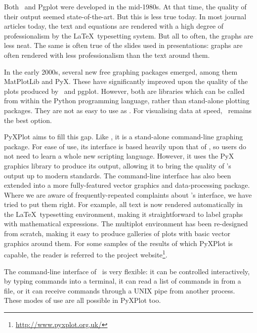 Both \gnuplot\ and Pgplot were developed in the mid-1980s. At that time, the
quality of their output seemed state-of-the-art. But this is less true today.
In most journal articles today, the text and equations are rendered with a high
degree of professionalism by the \LaTeX\ typesetting system. But all to often,
the graphs are less neat.  The same is often true of the slides used in
presentations: graphs are often rendered with less professionalism than the
text around them.

In the early 2000s, several new free graphing packages emerged, among them {\sc
MatPlotLib} and {\sc PyX}.  These have
significantly improved upon the quality of the plots produced by \gnuplot\ and
pgplot. However, both are libraries which can be called from within the Python
programming language, rather than stand-alone plotting packages. They are not
as easy to use as \gnuplot.  For visualising data at speed, \gnuplot\ remains the
best option.

{\sc PyXPlot} aims to fill this gap. Like \gnuplot, it is a stand-alone
command-line graphing package. For ease of use, its interface is based heavily
upon that of \gnuplot, so users do not need to learn a whole new scripting
language. However, it uses the PyX graphics library to produce its output,
allowing it to bring the quality of \gnuplot's output up to modern standards.
The command-line interface has also been extended into a more fully-featured
vector graphics and data-processing package.  Where we are aware of
frequently-repeated complaints about \gnuplot's interface, we have tried to put
them right.  For example, all text is now rendered automatically in the \LaTeX\
typesetting environment, making it straightforward to label graphs with
mathematical expressions. The multiplot environment has been re-designed from
scratch, making it easy to produce galleries of plots with basic vector
graphics around them.  For some samples of the results of which PyXPlot is
capable, the reader is referred to the project
website\footnote{\url{http://www.pyxplot.org.uk/}}.

The command-line interface of \gnuplot\ is very flexible: it can be controlled
interactively, by typing commands into a terminal, it can read a list of
commands in from a file, or it can receive commands through a UNIX pipe from
another process. These modes of use are all possible in PyXPlot too.

